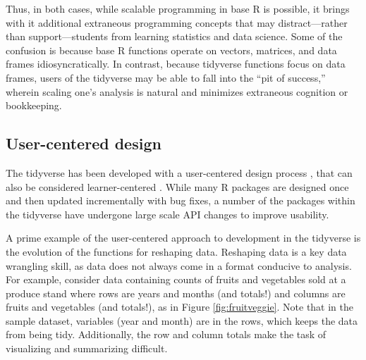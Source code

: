 \documentclass[12pt]{article}
\begin{document}

\label{base-scaling-3} \linespread{2}
\vspace{3mm}\setlength{\parindent}{15pt}

Thus, in both cases, while scalable programming in base R is possible,
it brings with it additional extraneous programming concepts that may
distract---rather than support---students from learning statistics and
data science. Some of the confusion is because base R functions operate
on vectors, matrices, and data frames idiosyncratically. In contrast,
because tidyverse functions focus on data frames, users of the tidyverse
may be able to fall into the ``pit of success,'' \citep{wickham2016user}
wherein scaling one's analysis is natural and minimizes extraneous
cognition or bookkeeping.

\hypertarget{sec:user-centered}{%
\subsection{User-centered design}\label{sec:user-centered}}

The tidyverse has been developed with a user-centered design process
\citep{kling1977organizational, norman1986}, that can also be considered
learner-centered \citep{solowayetal1994}. While many R packages are
designed once and then updated incrementally with bug fixes, a number of
the packages within the tidyverse have undergone large scale API changes
to improve usability.

A prime example of the user-centered approach to development in the
tidyverse is the evolution of the functions for reshaping data.
Reshaping data is a key data wrangling skill, as data does not always
come in a format conducive to analysis. For example, consider data
containing counts of fruits and vegetables sold at a produce stand where
rows are years and months (and totals!) and columns are fruits and
vegetables (and totals!), as in Figure \ref{fig:fruitveggie}. Note that
in the sample dataset, variables (year and month) are in the rows, which
keeps the data from being tidy. Additionally, the row and column totals
make the task of visualizing and summarizing difficult.
\end{document}

